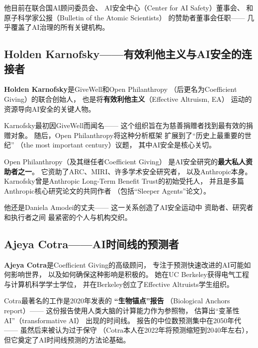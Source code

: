 他目前在联合国AI顾问委员会、
AI安全中心（Center for AI Safety）董事会、
和原子科学家公报（Bulletin of the Atomic Scientists）
的赞助者董事会任职——
几乎覆盖了AI治理的所有关键机构。

\subsection{Holden Karnofsky——有效利他主义与AI安全的连接者}
\label{subsec:karnofsky}

\textbf{Holden Karnofsky}是GiveWell和Open Philanthropy
（后更名为Coefficient Giving）的联合创始人，
也是将\textbf{有效利他主义}（Effective Altruism, EA）
运动的资源导向AI安全的关键人物。

Karnofsky最初因GiveWell而闻名——
这个组织旨在为慈善捐赠者找到最有效的捐赠对象。
随后，Open Philanthropy将这种分析框架
扩展到了``历史上最重要的世纪''
（the most important century）议题，
其中AI安全是核心关切。

Open Philanthropy（及其继任者Coefficient Giving）
是AI安全研究的\textbf{最大私人资助者之一}。
它资助了ARC、MIRI、许多学术安全研究者，
以及Anthropic本身。
Karnofsky曾是Anthropic Long-Term Benefit Trust的初始受托人，
并且是多篇Anthropic核心研究论文的共同作者
（包括``Sleeper Agents''论文）。

他还是Daniela Amodei的丈夫——
这一关系创造了AI安全运动中
资助者、研究者和执行者之间
最紧密的个人与机构交织。

\subsection{Ajeya Cotra——AI时间线的预测者}
\label{subsec:cotra}

\textbf{Ajeya Cotra}是Coefficient Giving的高级顾问，
专注于预测快速改进的AI可能如何影响世界，
以及如何确保这种影响是积极的。
她在UC Berkeley获得电气工程与计算机科学学士学位，
并在Berkeley创立了Effective Altruists学生组织。

Cotra最著名的工作是2020年发表的
\textbf{``生物锚点''报告}
（Biological Anchors report）——
这份报告使用人类大脑的计算能力作为参照物，
估算出``变革性AI''（transformative AI）
出现的时间线。
报告的中位数预测集中在2050年代——
虽然后来被认为过于保守
（Cotra本人在2022年将预测缩短到2040年左右），
但它奠定了AI时间线预测的方法论基础。

